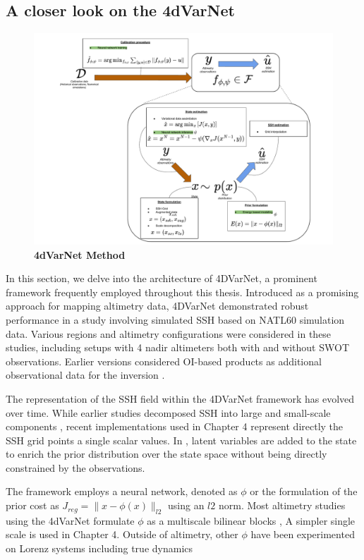 \begin{bibunit}
\section{A closer look on the 4dVarNet}
\begin{figure}[h]
    \centering
    \includegraphics[width=\textwidth]{00_LitReview/Method-4dvarnet.pdf}
    \caption{\textbf{4dVarNet Method}}
    \label{c2fig:method4}
\end{figure}
In this section, we delve into the architecture of 4DVarNet, a prominent framework frequently employed throughout this thesis. 
Introduced as a promising approach for mapping altimetry data, 4DVarNet demonstrated robust performance in a study involving simulated SSH based on NATL60 simulation data\cite{fablet_end2end_2021}. Various regions \cite{beauchamp4DVarNetSSHEndtoendLearning2023} and altimetry configurations were considered in these studies, including setups with 4 nadir altimeters both with and without SWOT observations. Earlier versions considered OI-based products as additional observational data for the inversion \cite{fablet_end2end_2021}.

The representation of the SSH field within the 4DVarNet framework has evolved over time. While earlier studies decomposed SSH into large and small-scale components \cite{beauchampDatadrivenLearningbasedInterpolations2021}, recent implementations used in Chapter 4 represent directly the SSH grid points a single scalar values. In  \cite{fablet_end2end_2021}, latent variables are added to the state to enrich the prior distribution over the state space without being directly constrained by the observations.

The framework employs a neural network, denoted as  $\phi$  or the formulation of the prior cost as $J_{reg}= \|x - \phi(x)\|_{l2}$ using an $l2$ norm.
Most altimetry studies using the 4dVarNet formulate $\phi$ as a multiscale bilinear blocks \cite{fabletBilinearResidualNeural2018}, A simpler single scale is used in Chapter 4. Outside of altimetry, other $\phi$ have been experimented on Lorenz systems including true dynamics\cite{fabletLearningVariationalData2021}


\end{bibunit}
